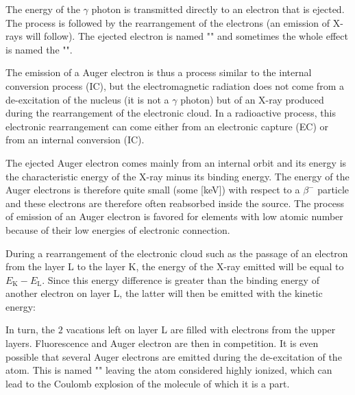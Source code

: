 	The energy of the $\gamma$ photon is transmitted directly to an electron that is ejected. The process is followed by the rearrangement of the electrons (an emission of X-rays will follow). The ejected electron is named "" and sometimes the whole effect is named the "".
	
	The emission of a Auger electron is thus a process similar to the internal conversion process (IC), but the electromagnetic radiation does not come from a de-excitation of the nucleus (it is not a $\gamma$ photon) but of an X-ray produced during the rearrangement of the electronic cloud. In a radioactive process, this electronic rearrangement can come either from an electronic capture (EC) or from an internal conversion (IC).

	The ejected Auger electron comes mainly from an internal orbit and its energy is the characteristic energy of the X-ray minus its binding energy. The energy of the Auger electrons is therefore quite small (some [keV]) with respect to a  $\beta^{-}$ particle and these electrons are therefore often reabsorbed inside the source. The process of emission of an Auger electron is favored for elements with low atomic number because of their low energies of electronic connection.

	During a rearrangement of the electronic cloud such as the passage of an electron from the layer L to the layer K, the energy of the X-ray emitted will be equal to $E_\text{K}-E_\text{L}$. Since this energy difference is greater than the binding energy of another electron on layer L, the latter will then be emitted with the kinetic energy:
	
	In turn, the $2$ vacations left on layer L are filled with electrons from the upper layers. Fluorescence and Auger electron are then in competition. It is even possible that several Auger electrons are emitted during the de-excitation of the atom. This is named "" leaving the atom considered highly ionized, which can lead to the Coulomb explosion of the molecule of which it is a part.
	
